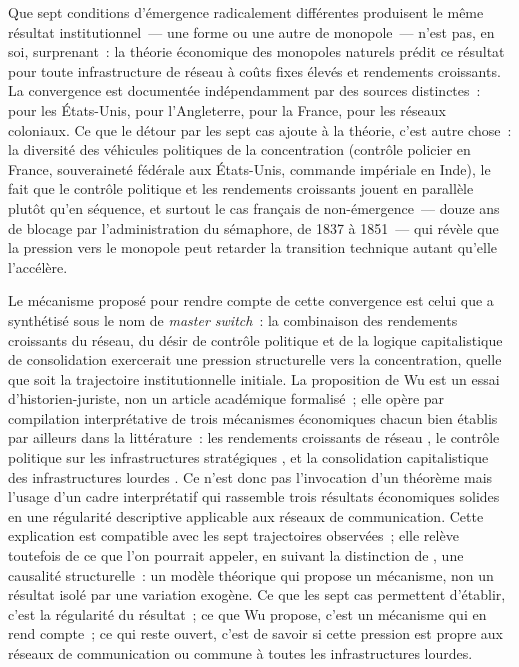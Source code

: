 %
Que sept conditions d'émergence radicalement différentes produisent le même résultat institutionnel~--- une forme ou une autre de monopole~--- n'est pas, en soi, surprenant~: la théorie économique des monopoles naturels prédit ce résultat pour toute infrastructure de réseau à coûts fixes élevés et rendements croissants. La convergence est documentée indépendamment par des sources distinctes~: \textcite{nonnenmacher_telegraph_2001} pour les États-Unis, \textcite{kieve_electric_1973} pour l'Angleterre, \textcite{bertho_histoire_1984} pour la France, \textcite{headrick_invisible_1991} pour les réseaux coloniaux. Ce que le détour par les sept cas ajoute à la théorie, c'est autre chose~: la diversité des véhicules politiques de la concentration (contrôle policier en France, souveraineté fédérale aux États-Unis, commande impériale en Inde), le fait que le contrôle politique et les rendements croissants jouent en parallèle plutôt qu'en séquence, et surtout le cas français de non-émergence~--- douze ans de blocage par l'administration du sémaphore, de 1837 à 1851~--- qui révèle que la pression vers le monopole peut retarder la transition technique autant qu'elle l'accélère.

Le mécanisme proposé pour rendre compte de cette convergence est celui que \textcite{wu2010master} a synthétisé sous le nom de \emph{master switch}~: la combinaison des rendements croissants du réseau, du désir de contrôle politique et de la logique capitalistique de consolidation exercerait une pression structurelle vers la concentration, quelle que soit la trajectoire institutionnelle initiale. La proposition de Wu est un essai d'historien-juriste, non un article académique formalisé~; elle opère par compilation interprétative de trois mécanismes économiques chacun bien établis par ailleurs dans la littérature~: les rendements croissants de réseau \parencite{katz_network_1985, economides_economics_1996}, le contrôle politique sur les infrastructures stratégiques \parencite{mazzucato_entrepreneurial_2013, headrick_invisible_1991}, et la consolidation capitalistique des infrastructures lourdes \parencite{chandler_visible_1977, perez_technological_2002}. Ce n'est donc pas l'invocation d'un théorème mais l'usage d'un cadre interprétatif qui rassemble trois résultats économiques solides en une régularité descriptive applicable aux réseaux de communication. Cette explication est compatible avec les sept trajectoires observées~; elle relève toutefois de ce que l'on pourrait appeler, en suivant la distinction de \textcite[ch.~6]{trannoy_economistes_2025}, une causalité structurelle~: un modèle théorique qui propose un mécanisme, non un résultat isolé par une variation exogène. Ce que les sept cas permettent d'établir, c'est la régularité du résultat~; ce que Wu propose, c'est un mécanisme qui en rend compte~; ce qui reste ouvert, c'est de savoir si cette pression est propre aux réseaux de communication ou commune à toutes les infrastructures lourdes.

